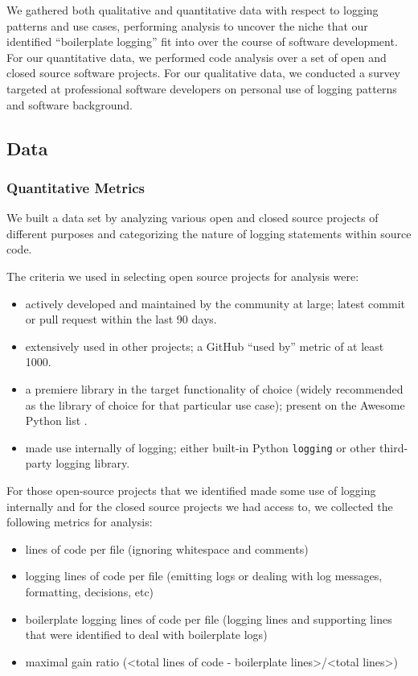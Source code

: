 \documentclass[acmsmall,review,authorversion]{acmart}
\newcommand{\code}[1]{\lstinline[basicstyle=\ttfamily\small]~#1~}
\begin{document}
We gathered both qualitative and quantitative data with respect to logging patterns and use cases, performing analysis to uncover the niche that our identified ``boilerplate logging'' fit into over the course of software development. For our quantitative data, we performed code analysis over a set of open and closed source software projects. For our qualitative data, we conducted a survey targeted at professional software developers on personal use of logging patterns and software background.

\subsection{Data}

\subsubsection{Quantitative Metrics}

We built a data set by analyzing various open and closed source projects of different purposes and categorizing the nature of logging statements within source code.

The criteria we used in selecting open source projects for analysis were:

\begin{itemize}
    \item actively developed and maintained by the community at large; latest commit or pull request within the last 90 days.
    \item extensively used in other projects; a GitHub ``used by'' metric of at least 1000.
    \item a premiere library in the target functionality of choice (widely recommended as the library of choice for that particular use case); present on the Awesome Python list \cite{awesome-python}.
    \item made use internally of logging; either built-in Python \code{logging} or other third-party logging library.
\end{itemize}

For those open-source projects that we identified made some use of logging internally and for the closed source projects we had access to, we collected the following metrics for analysis:

\begin{itemize}
    \item lines of code per file (ignoring whitespace and comments)
    \item logging lines of code per file (emitting logs or dealing with log messages, formatting, decisions, etc)
    \item boilerplate logging lines of code per file (logging lines and supporting lines that were identified to deal with boilerplate logs)
    \item maximal gain ratio (<total lines of code - boilerplate lines>/<total lines>)
\end{itemize}
\end{document}
